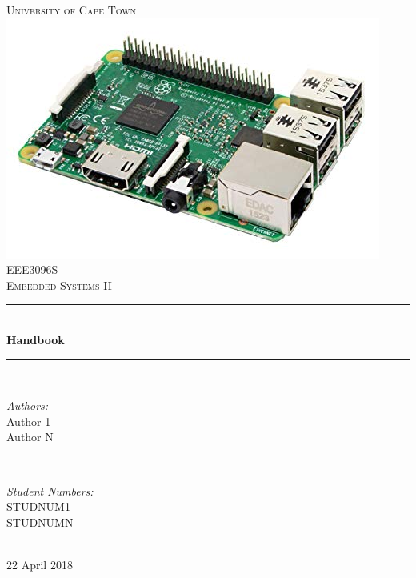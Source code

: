 \newpage
\begin{titlepage}
	\centering
	\vspace*{0.5 cm}
	
	\textsc{\LARGE University of Cape Town}\\[2.0 cm]	%
	\includegraphics[scale = 0.5]{Figures/rpi.jpg}\\[1 cm]	%
	\textsc{\Large EEE3096S}\\[0.5 cm]				%
	\textsc{\large Embedded Systems II}\\[0.5 cm]				%
	\rule{\linewidth}{0.2 mm} \\[0.4 cm]
	{ \huge \bfseries Handbook}\\
	\rule{\linewidth}{0.2 mm} \\[1.5 cm]
	
	\begin{minipage}{0.4\textwidth}
		\begin{flushleft} \large
			\emph{Authors:}\\
			Author 1\\
            Author N
		\end{flushleft}
	\end{minipage}~
	\begin{minipage}{0.4\textwidth}
		\begin{flushright} \large
			\emph{Student Numbers:} \\
			STUDNUM1\\	
            STUDNUMN
		\end{flushright}
	\end{minipage}\\[2 cm]
	{\large 22 April 2018}\\[2 cm]
	\vfill
\end{titlepage}
